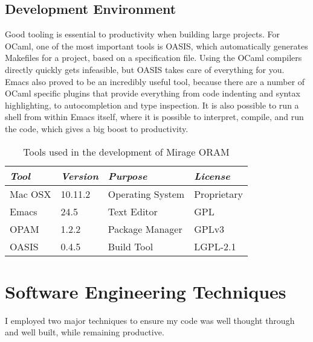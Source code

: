 \documentclass[12pt,a4paper,twoside,openright]{report}
\begin{document}
\subsection{Development Environment}

Good tooling is essential to productivity when building large projects. For OCaml, one of the most important tools is OASIS, which automatically generates Makefiles for a project, based on a specification file. Using the OCaml compilers directly quickly gets infeasible, but OASIS takes care of everything for you. Emacs also proved to be an incredibly useful tool, because there are a number of OCaml specific plugins that provide everything from code indenting and syntax highlighting, to autocompletion and type inspection. It is also possible to run a shell from within Emacs itself, where it is possible to interpret, compile, and run the code, which gives a big boost to productivity.

\begin{table}[h]
\centering
\begin{tabular}{|l|l|l|l|}
\hline
\textit{Tool} & \textit{Version} & \textit{Purpose} & \textit{License} \\
\hline \hline
Mac OSX & 10.11.2 & Operating System & Proprietary \\
\hline
Emacs & 24.5 & Text Editor & GPL \\
\hline
OPAM & 1.2.2 & Package Manager & GPLv3 \\
\hline
OASIS & 0.4.5 & Build Tool & LGPL-2.1 \\
\hline
\end{tabular}
\caption{Tools used in the development of Mirage ORAM}
\label{tab:devtools}
\end{table}


\section{Software Engineering Techniques}



I employed two major techniques to ensure my code was well thought through and well built, while remaining productive.
\end{document}
